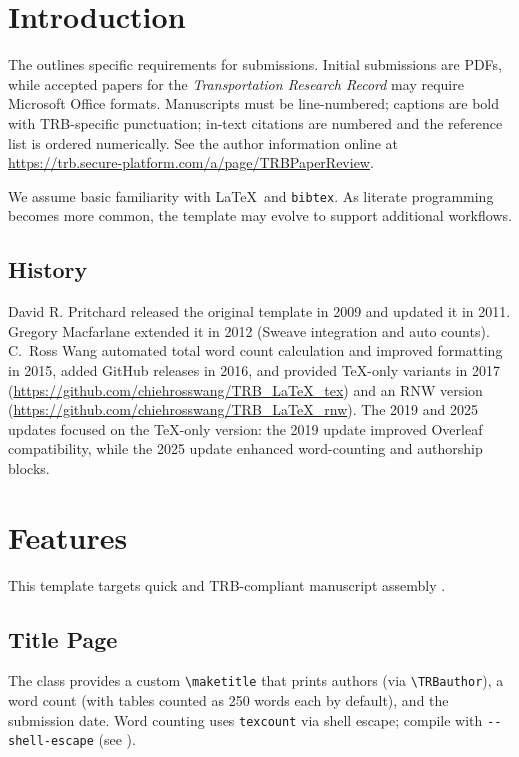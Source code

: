 \documentclass[numbered]{trbunofficial2}
\begin{document}
\section{Introduction}\label{sec:intro}
The \citep{TRBGuide} outlines specific requirements for submissions. Initial submissions are PDFs, while accepted papers for the \textit{Transportation Research Record} may require Microsoft Office formats. Manuscripts must be line-numbered; captions are bold with TRB-specific punctuation; in-text citations are numbered and the reference list is ordered numerically. See the author information online at \url{https://trb.secure-platform.com/a/page/TRBPaperReview}.

We assume basic familiarity with \LaTeX\ and \verb|bibtex|. As literate programming becomes more common, the template may evolve to support additional workflows.


\subsection{History}
David R. Pritchard released the original template in 2009 and updated it in 2011. Gregory Macfarlane extended it in 2012 (Sweave integration and auto counts). C.\ Ross Wang automated total word count calculation and improved formatting in 2015, added GitHub releases in 2016, and provided \TeX-only variants in 2017 (\url{https://github.com/chiehrosswang/TRB_LaTeX_tex}) and an RNW version (\url{https://github.com/chiehrosswang/TRB_LaTeX_rnw}). The 2019 and 2025 updates focused on the \TeX-only version: the 2019 update improved Overleaf compatibility, while the 2025 update enhanced word-counting and authorship blocks.

\section{Features}
This template targets quick and TRB-compliant manuscript assembly \cite{trbwebsite}.

\subsection{Title Page}
The class provides a custom \verb|\maketitle| that prints authors (via \verb|\TRBauthor|), a word count (with tables counted as 250 words each by default), and the submission date. Word counting uses \verb|texcount| via shell escape; compile with \verb|--shell-escape| (see ).
\end{document}
